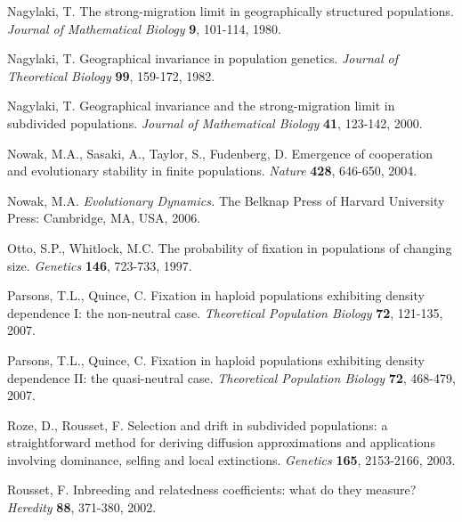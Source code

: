 \documentclass[11pt]{article}
\begin{document}
\begin{thebibliography}{99}
Nagylaki, T. The strong-migration limit in geographically structured populations.  {\it  Journal of Mathematical Biology} {\bf 9}, 101-114, 1980.



Nagylaki, T.  Geographical invariance in population genetics.  {\it  Journal of Theoretical Biology} {\bf 99}, 159-172, 1982.

Nagylaki, T.  Geographical invariance and the strong-migration limit in subdivided populations. {\it  Journal of Mathematical Biology} {\bf 41}, 123-142, 2000.





Nowak, M.A., Sasaki, A., Taylor, S., Fudenberg, D.
Emergence of cooperation and evolutionary stability in finite populations.
 {\it Nature} {\bf 428}, 646-650, 2004.

Nowak, M.A.  {\it Evolutionary Dynamics.} The Belknap Press of Harvard University Press: Cambridge, MA, USA, 2006.

Otto, S.P., Whitlock, M.C. The probability of fixation in populations of changing size.  {\it Genetics} {\bf 146}, 723-733, 1997.


Parsons, T.L., Quince, C. Fixation in haploid populations exhibiting density dependence I: the non-neutral case. {\it Theoretical Population Biology} {\bf 72}, 121-135, 2007.

Parsons, T.L., Quince, C. Fixation in haploid populations exhibiting density dependence II: the quasi-neutral case. {\it Theoretical Population Biology} {\bf 72}, 468-479, 2007.

Roze, D., Rousset, F. Selection and drift in subdivided populations: a straightforward method for deriving diffusion approximations and applications involving dominance, selfing and local extinctions. {\it Genetics} {\bf 165}, 2153-2166, 2003.

Rousset, F. Inbreeding and relatedness coefficients: what do they measure? {\it Heredity} {\bf 88}, 371-380, 2002.

%



\end{thebibliography}
\end{document}
